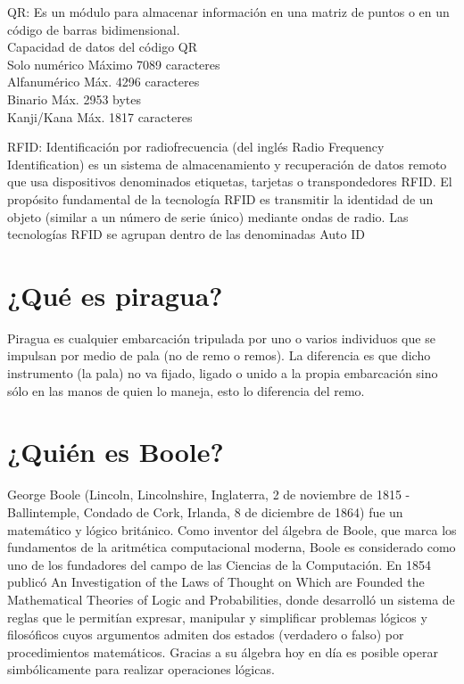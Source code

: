 \documentclass{mylib/reporte}
\begin{document}
QR: Es un módulo para almacenar información en una matriz de puntos o en un código de barras bidimensional. \\
Capacidad de datos del código QR \\
Solo numérico Máximo 7089 caracteres \\
Alfanumérico Máx. 4296 caracteres \\
Binario Máx. 2953 bytes \\
Kanji/Kana Máx. 1817 caracteres

RFID: Identificación por radiofrecuencia (del inglés Radio Frequency Identification) es un sistema de almacenamiento y recuperación de datos remoto que usa dispositivos denominados etiquetas, tarjetas o transpondedores RFID. El propósito fundamental de la tecnología RFID es transmitir la identidad de un objeto (similar a un número de serie único) mediante ondas de radio. Las tecnologías RFID se agrupan dentro de las denominadas Auto ID


\section{¿Qué es piragua?}

Piragua es cualquier embarcación tripulada por uno o varios individuos que se impulsan por medio de pala (no de remo o remos). La diferencia es que dicho instrumento (la pala) no va fijado, ligado o unido a la propia embarcación sino sólo en las manos de quien lo maneja, esto lo diferencia del remo.

\section{¿Quién es Boole?}

George Boole (Lincoln, Lincolnshire, Inglaterra, 2 de noviembre de 1815 - Ballintemple, Condado de Cork, Irlanda, 8 de diciembre de 1864) fue un matemático y lógico británico. Como inventor del álgebra de Boole, que marca los fundamentos de la aritmética computacional moderna, Boole es considerado como uno de los fundadores del campo de las Ciencias de la Computación. En 1854 publicó An Investigation of the Laws of Thought on Which are Founded the Mathematical Theories of Logic and Probabilities, donde desarrolló un sistema de reglas que le permitían expresar, manipular y simplificar problemas lógicos y filosóficos cuyos argumentos admiten dos estados (verdadero o falso) por procedimientos matemáticos. Gracias a su álgebra hoy en día es posible operar simbólicamente para realizar operaciones lógicas.
\end{document}
